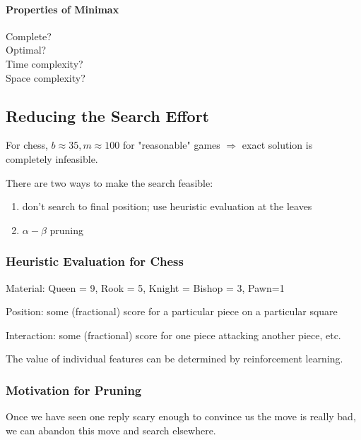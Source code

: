 \paragraph{Properties of Minimax}
Complete?\\
Optimal?\\
Time complexity?\\
Space complexity?

\subsection{Reducing the Search Effort}
For chess, $b \approx 35, m \approx 100$ for "reasonable" games $\Rightarrow$
exact solution is completely infeasible.

There are two ways to make the search feasible:
\begin{enumerate}
    \item don't search to final position; use heuristic evaluation at the
    leaves
    \item $\alpha-\beta$ pruning
\end{enumerate}

\subsubsection{Heuristic Evaluation for Chess}
Material: Queen = 9, Rook = 5, Knight = Bishop = 3, Pawn=1

Position: some (fractional) score for a particular piece on a particular square

Interaction: some (fractional) score for one piece attacking another piece,
etc.

The value of individual features can be determined by reinforcement learning.

\subsubsection{Motivation for Pruning}
Once we have seen one reply scary enough to convince us the move is really bad,
we can abandon this move and search elsewhere.

